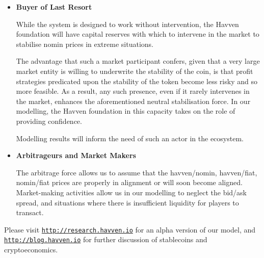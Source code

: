 \begin{itemize}

	\item[] \textbf{Buyer of Last Resort}
	
	While the system is designed to work without intervention, the Havven foundation
	will have capital reserves with which to intervene in the market to stabilise
	nomin prices in extreme situations. 
	
	The advantage that such a market participant confers, given that a very large market entity is
	willing to underwrite the stability of the coin, is that profit strategies predicated upon the
	stability of the token become less risky and so more feasible. As a result, 
	any such presence, even if it rarely intervenes in the market, enhances the
	aforementioned neutral stabilisation force. In our modelling, the Havven foundation in this capacity takes on the role of providing confidence.
	
	Modelling results will inform the need of such an actor in the ecosystem.

	\item[] \textbf{Arbitrageurs and Market Makers}

	The arbitrage force allows us to assume that the havven/nomin, havven/fiat, nomin/fiat
	prices are properly in alignment or will soon become aligned. Market-making activities
	allow us in our modelling to neglect the bid/ask spread, and situations where there is insufficient
	liquidity for players to transact.
	
\end{itemize}

\noindent Please visit \href{http://research.havven.io}{\texttt{http://research.havven.io}} for an alpha version of our model,
and \href{http://blog.havven.io}{\texttt{http://blog.havven.io}} for further discussion of stablecoins and
cryptoeconomics.

\pagebreak




